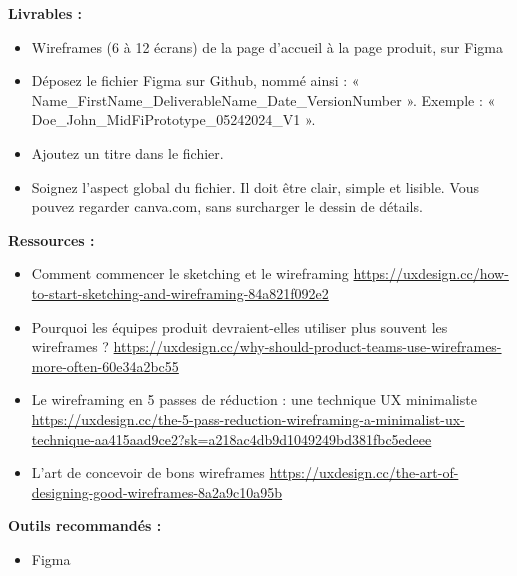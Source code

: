 \textbf{Livrables :}

\begin{itemize}
\item Wireframes (6 à 12 écrans) de la page d'accueil à la page produit, sur Figma
\item Déposez le fichier Figma sur Github, nommé ainsi : « Name\_FirstName\_DeliverableName\_Date\_VersionNumber ». Exemple : « Doe\_John\_MidFiPrototype\_05242024\_V1 ».
\item Ajoutez un titre dans le fichier.
\item Soignez l'aspect global du fichier. Il doit être clair, simple et lisible. Vous pouvez regarder canva.com, sans surcharger le dessin de détails.
\end{itemize}

\textbf{Ressources :}

\begin{itemize}
\item Comment commencer le sketching et le wireframing \url{https://uxdesign.cc/how-to-start-sketching-and-wireframing-84a821f092e2}
\item Pourquoi les équipes produit devraient-elles utiliser plus souvent les wireframes ? \url{https://uxdesign.cc/why-should-product-teams-use-wireframes-more-often-60e34a2bc55}
\item Le wireframing en 5 passes de réduction : une technique UX minimaliste \url{https://uxdesign.cc/the-5-pass-reduction-wireframing-a-minimalist-ux-technique-aa415aad9ce2?sk=a218ac4db9d1049249bd381fbc5edeee}
\item L'art de concevoir de bons wireframes \url{https://uxdesign.cc/the-art-of-designing-good-wireframes-8a2a9c10a95b}
\end{itemize}

\textbf{Outils recommandés :}

\begin{itemize}
\item Figma
\end{itemize}

